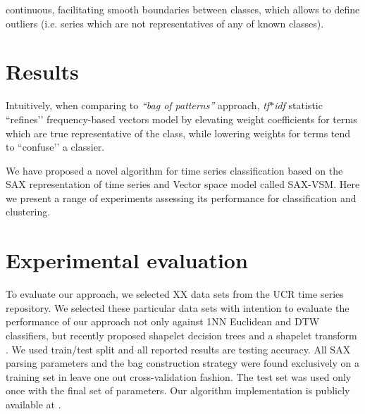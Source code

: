 \documentclass{llncs}
\begin{document}
continuous, facilitating smooth boundaries between
classes, which allows to define outliers (i.e. series which are not representatives of any of known
classes).

\section{Results}

Intuitively, when comparing to \textit{``bag of patterns''} \cite{bag_patterns} approach,
\textit{tf$\ast$idf} statistic ``refines’’ frequency-based vectors model by elevating weight
coefficients for terms which are true representative of the class, while lowering
weights for terms tend to ``confuse’’ a classier.

We have proposed a novel algorithm for time series classification based on the SAX
representation of time series and Vector space model called SAX-VSM. Here we present a range of
experiments assessing its performance for classification and clustering.

\section{Experimental evaluation}
To evaluate our approach, we selected XX data sets from the UCR time series repository.
We selected these particular data sets with intention to evaluate the performance of our approach
not only against 1NN Euclidean and DTW classifiers, but recently proposed shapelet decision trees
and a shapelet transform \cite{bagnal}.
We used train/test split and all reported results are testing accuracy. All SAX parsing parameters
and the bag construction strategy were found exclusively on a training set in leave one out 
cross-validation fashion. The test set was used only once with the final set of parameters. 
Our algorithm implementation is publicly available at \cite{jmotif}.
\end{document}
